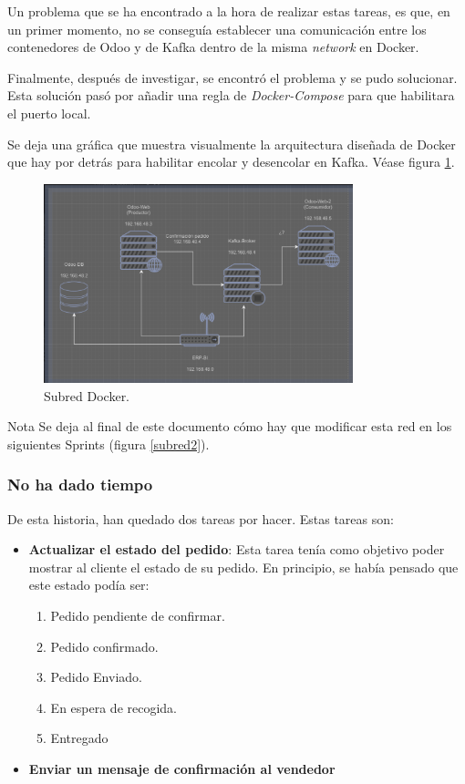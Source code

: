 \documentclass[12pt, a4paper, twoside]{article} %
\newcommand{\B}[1]{\textbf{#1}}
\newcommand{\ti}{\emph} %
\begin{document}
Un problema que se ha encontrado a la hora de realizar estas tareas, es que, en un primer momento, no se conseguía establecer una comunicación entre los contenedores de Odoo y de Kafka dentro de la misma \ti{network} en Docker.

Finalmente, después de investigar, se encontró el problema y se pudo solucionar. Esta solución pasó por añadir una regla de \ti{Docker-Compose} para que habilitara el puerto local. 

Se  deja una gráfica que muestra visualmente la arquitectura diseñada de Docker que hay por detrás para habilitar encolar y desencolar en Kafka. Véase figura \ref{subred1}.


\begin{figure}[H]
    \centering
    \includegraphics[width = 0.8\textwidth]{aa_imgs/img_arq_1}
    \caption{Subred Docker.}
    \label{subred1}
\end{figure}

\begin{ejemplo}{Nota}
Se deja al final de este documento cómo hay que modificar esta red en los siguientes Sprints (figura \ref{subred2}).
\end{ejemplo}


\subsubsection{No ha dado tiempo}
De esta historia, han quedado dos tareas por hacer. Estas tareas son:
\begin{itemize}
    \item  \B{Actualizar el estado del pedido}: Esta tarea tenía como objetivo poder mostrar al cliente el estado de su pedido. En principio, se había pensado que este estado podía ser: 
    \begin{enumerate}
        \item Pedido pendiente de confirmar.
        \item Pedido confirmado.
        \item Pedido Enviado.
        \item En espera de recogida.
        \item Entregado
    \end{enumerate}
    \item  \B{Enviar un mensaje de confirmación al vendedor}
    
\end{itemize}
\end{document}

